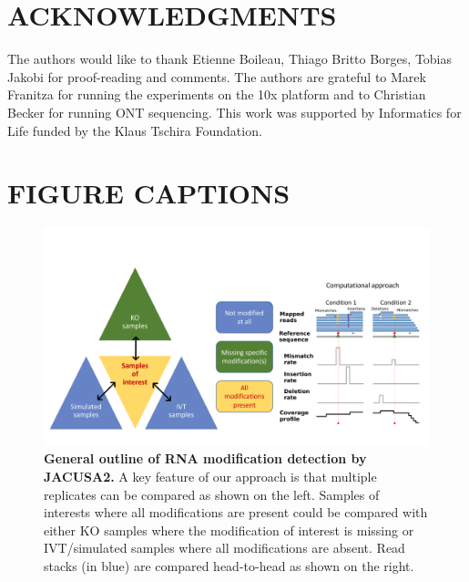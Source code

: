 \documentclass[times, 11pt, a4paper]{article}
\begin{document}
\section*{ACKNOWLEDGMENTS}
  The authors would like to thank Etienne Boileau, Thiago Britto Borges, Tobias Jakobi for proof-reading and comments.
  The authors are grateful to Marek Franitza for running the experiments on the 10x platform and to Christian Becker for running ONT sequencing.
  This work was supported by Informatics for Life funded by the Klaus Tschira Foundation.

 

\newpage

\section*{FIGURE CAPTIONS}

\begin{figure}[h!]
    \includegraphics[width = 1\textwidth]{Figure1.pdf}
  \caption{\textbf{General outline of RNA modification detection by JACUSA2.} A key feature of our approach is that multiple replicates can be compared as shown on the left. Samples of interests where all modifications are present could be compared with either KO samples where the modification of interest is missing or IVT/simulated samples where all modifications are absent. Read stacks (in blue) are compared head-to-head as shown on the right. }
  \label{fig:graphicsummary}
      \end{figure}
\newpage
\end{document}
